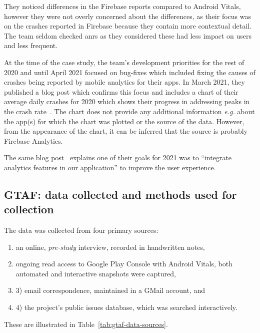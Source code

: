 They noticed differences in the Firebase reports compared to Android Vitals, however they were not overly concerned about the differences, as their focus was on the crashes reported in Firebase because they contain more contextual detail. The team seldom checked \acrshort{anr}s as they considered these had less impact on users and less frequent. %

At the time of the case study, the team's development priorities for the rest of 2020 and until April 2021 focused on bug-fixes which included fixing the causes of crashes being reported by mobile analytics for their apps. In March 2021, they published a blog post which confirms this focus and includes a chart of their average daily crashes for 2020 which shows their progress in addressing peaks in the crash rate~. The chart does not provide any additional information \emph{e.g.} about the app(s) for which the chart was plotted or the source of the data. However, from the appearance of the chart, it can be inferred that the source is probably Firebase Analytics.

The same blog post~ explains one of their goals for 2021 was to ``integrate analytics features in our application'' to improve the user experience.

\subsection{GTAF: data collected and methods used for collection}
The data was collected from four primary sources:
{\small
\begin{enumerate}
    \itemsep0em
    \item an online, \textit{pre-study} interview, recorded in handwritten notes, 
    \item ongoing read access to Google Play Console with Android Vitals, both automated and interactive snapshots were captured, 
    \item 3) email correspondence, maintained in a GMail account, and 
    \item 4) the project's public issues database, which was searched interactively. 
\end{enumerate}
}
These are illustrated in Table~\ref{tab:gtaf-data-sources}.


